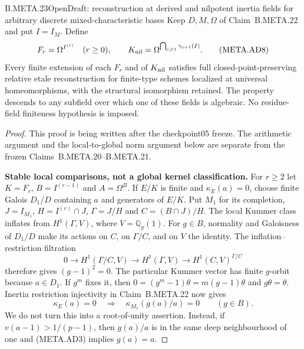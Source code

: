 \begin{claim}{B.META.23}{Open}{Draft: reconstruction at derived and nilpotent inertia fields for arbitrary discrete mixed-characteristic bases}
Keep $D,M,\Omega$ of Claim~B.META.22 and put $I=I_M$.
Define
\[
 F_r=\Omega^{I^{(r)}}\quad(r\ge0),\qquad
 K_{\rm nil}=\Omega^{\bigcap_{c\ge1}\gamma_{c+1}(I)}.
                                                               \tag{META.AD8}
\]
Every finite extension of each $F_r$ and of $K_{\rm nil}$
satisfies full closed-point-preserving relative etale
reconstruction for finite-type schemes localized at
universal homeomorphisms, with the structural
isomorphism retained.  The property descends to any
subfield over which one of these fields is algebraic.
No residue-field finiteness hypothesis is imposed.
\end{claim}
\begin{proof}
This proof is being written after the checkpoint05
freeze.  The arithmetic argument and the local-to-global
norm argument below are separate from the frozen
Claims~B.META.20--B.META.21.

\medskip\noindent\textbf{Stable local comparisons, not a global kernel classification.}
For $r\ge2$ let $K=F_r$, $B=I^{(r-1)}$ and
$A=\Omega^B$.
If $E/K$ is finite and $\kappa_E(a)=0$, choose finite
Galois $D_1/D$ containing $a$ and generators of $E/K$.
Put $M_1$ for its completion, $J=I_{M_1}$,
$H=I^{(r)}\cap J$, $\Gamma=J/H$ and
$C=(B\cap J)/H$.
The local Kummer class inflates from $H^1(\Gamma,V)$,
where $V=\mathbb Q_p(1)$.
For $g\in B$, normality and Galoisness of $D_1/D$
make its actions on $C$, on $\Gamma/C$, and on $V$
the identity.  The inflation--restriction filtration
\[
 0\longrightarrow H^1(\Gamma/C,V)
 \longrightarrow H^1(\Gamma,V)
 \longrightarrow H^1(C,V)^{\Gamma/C}
\]
therefore gives $(g-1)^2=0$.
The particular Kummer vector has finite $g$-orbit
because $a\in D_1$.  If $g^m$ fixes it, then
$0=(g^m-1)\theta=m(g-1)\theta$ and $g\theta=\theta$.
Inertia restriction injectivity in Claim~B.META.22
now gives
\[
 \kappa_E(a)=0\quad\Longrightarrow\quad
             \kappa_{M_1}(g(a)/a)=0\qquad(g\in B).              \tag{META.AD9}
\]
We do not turn this into a root-of-unity assertion.
Instead, if $v(a-1)>1/(p-1)$, then $g(a)/a$ is in
the same deep neighbourhood of one and (META.AD3)
implies $g(a)=a$.


\end{proof}
